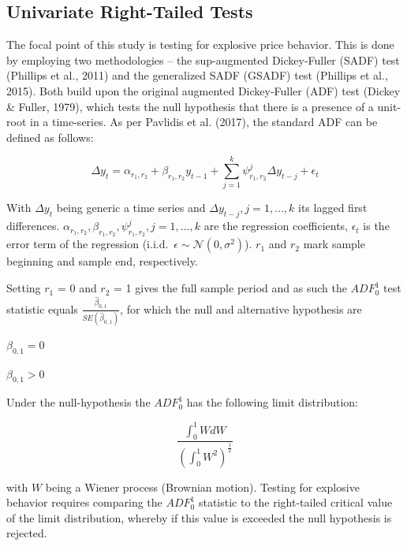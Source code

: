 \documentclass[11pt]{article}
\newcommand\iid{i.i.d.}
\newcommand\pN{\mathcal{N}}
\begin{document}
\subsection{Univariate Right-Tailed Tests}
The focal point of this study is testing for explosive price behavior. This is done by employing two methodologies -- the sup-augmented Dickey-Fuller (SADF) test (Phillips et al., 2011) and the generalized SADF (GSADF) test (Phillips et al., 2015). Both build upon the original augmented Dickey-Fuller (ADF) test (Dickey \& Fuller, 1979), which tests the null hypothesis that there is a presence of a unit-root in a time-series. As per Pavlidis et al. (2017), the standard ADF can be defined as follows:

\begin{equation}
\label{eq:adf_regression}
\Delta y_t = \alpha_{r_1, r_2} + \beta_{r_1, r_2} y_{t-1} + \sum_{j=1}^k \psi_{r_1, r_2}^{j} \Delta y_{t-j} + \epsilon_t 
\end{equation}

With $\Delta y_t$ being generic a time series and $\Delta y_{t-j}, j = 1, ..., k $ its lagged first differences. $\alpha_{r_1, r_2}, \beta_{r_1, r_2}, \psi_{r_1, r_2}^j, j = 1, ..., k$ are the regression coefficients, $\epsilon_t$ is the error term of the regression (\iid~$\epsilon  \sim \pN(0, \sigma^2)$). $r_1$ and $r_2$ mark sample beginning and sample end, respectively.

Setting $r_1$ = 0 and $r_2$ = 1 gives the full sample period and as such the $ADF_0^1$ test statistic equals $\frac{\hat{\beta}_{0,1}}{SE(\hat{\beta}_{0,1})}$, for which the null and alternative hypothesis are

\setcounter{hyp}{-1}
\begin{hyp} \label{hyp:a} $\beta_{0,1} = 0$ \end{hyp}
\begin{hyp} \label{hyp:b} $\beta_{0,1} > 0$ \end{hyp}
\newline

Under the null-hypothesis the $ADF_0^1$ has the following limit distribution:

$$ \frac{\int_0^1 WdW}{(\int_0^1 W^2)^\frac{1}{2}} $$

with $W$ being a Wiener process (Brownian motion). Testing for explosive behavior requires comparing the $ADF_0^1$ statistic to the right-tailed critical value of the limit distribution, whereby if this value is exceeded the null hypothesis is rejected.
\newline
\end{document}
